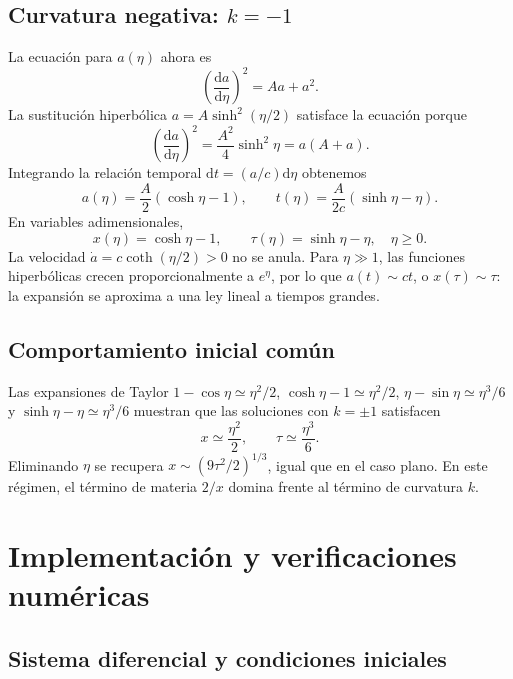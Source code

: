 \documentclass[letterpaper,11pt]{article}
\newcommand{\td}{\mathrm{d}}
\begin{document}
\subsection{Curvatura negativa: $k=-1$}

La ecuación para $a(\eta)$ ahora es
\[
\left(\frac{\td a}{\td\eta}\right)^2=Aa+a^2.
\]
La sustitución hiperbólica $a=A\sinh^2(\eta/2)$ satisface la ecuación porque
\[
\left(\frac{\td a}{\td\eta}\right)^2=\frac{A^2}{4}\sinh^2\eta=a(A+a).
\]
Integrando la relación temporal $\td t=(a/c)\td\eta$ obtenemos
\begin{equation}
\boxed{a(\eta)=\frac{A}{2}(\cosh\eta-1),\qquad
 t(\eta)=\frac{A}{2c}(\sinh\eta-\eta).}
\label{eq:abiertofis}
\end{equation}
En variables adimensionales,
\begin{equation}
\boxed{x(\eta)=\cosh\eta-1,\qquad \tau(\eta)=\sinh\eta-\eta,\quad\eta\geq0.}
\label{eq:abierto}
\end{equation}
La velocidad $\dot a=c\coth(\eta/2)>0$ no se anula. Para $\eta\gg1$, las funciones hiperbólicas crecen proporcionalmente a $e^\eta$, por lo que $a(t)\sim ct$, o $x(\tau)\sim\tau$: la expansión se aproxima a una ley lineal a tiempos grandes.

\subsection{Comportamiento inicial común}

Las expansiones de Taylor $1-\cos\eta\simeq\eta^2/2$, $\cosh\eta-1\simeq\eta^2/2$, $\eta-\sin\eta\simeq\eta^3/6$ y $\sinh\eta-\eta\simeq\eta^3/6$ muestran que las soluciones con $k=\pm1$ satisfacen
\[
x\simeq\frac{\eta^2}{2},\qquad \tau\simeq\frac{\eta^3}{6}.
\]
Eliminando $\eta$ se recupera $x\sim(9\tau^2/2)^{1/3}$, igual que en el caso plano. En este régimen, el término de materia $2/x$ domina frente al término de curvatura $k$.

\section{Implementación y verificaciones numéricas}

\subsection{Sistema diferencial y condiciones iniciales}
\end{document}

